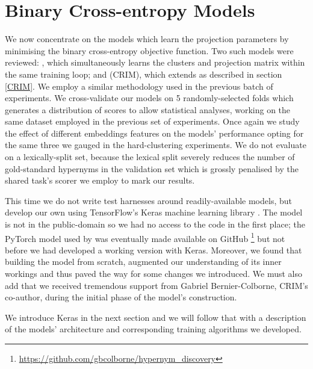 \section{Binary Cross-entropy Models}
We now concentrate on the models which learn the projection parameters by minimising the binary cross-entropy objective function. Two such models were reviewed: \citep{yamane2016distributional}, which simultaneously learns the clusters and projection matrix within the same training loop; and \citep{bernier2018crim} (CRIM), which extends \citep{yamane2016distributional} as described in section \ref{CRIM}.  We employ a similar methodology used in the previous batch of experiments.  We cross-validate our models on 5 randomly-selected folds which generates a distribution of scores to allow statistical analyses, working on the same dataset employed in the previous set of experiments.  Once again we study the effect of different embeddings features on the models' performance opting for the same three we gauged in the hard-clustering experiments.  We do not evaluate on a lexically-split set, because the lexical split severely reduces the number of gold-standard hypernyms in the validation set which is grossly penalised by the shared task's scorer we employ to mark our results.

This time we do not write test harnesses around readily-available models, but develop our own using TensorFlow's Keras machine learning library \citep{chollet2015keras}.  The \citet{yamane2016distributional} model is not in the public-domain so we had no access to the code in the first place; the PyTorch model used by \citet{bernier2018crim} was eventually made available on GitHub \footnote{\url{https://github.com/gbcolborne/hypernym_discovery}} but not before we had developed a working version with Keras.  Moreover, we found that building the model from scratch, augmented our understanding of its inner workings and thus paved the way for some changes we introduced.  We must also add that we received tremendous support from Gabriel Bernier-Colborne, CRIM's co-author, during the initial phase of the model's construction.

We introduce Keras in the next section and we will follow that with a description of the models' architecture and corresponding training algorithms we developed.

